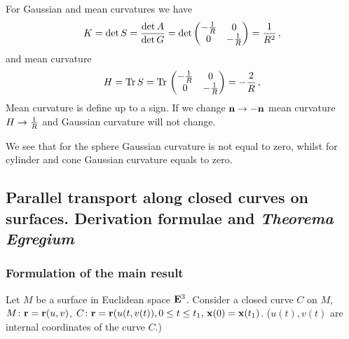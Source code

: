 \documentclass[12pt]{article}
\theoremstyle{theorem}
\numberwithin{equation}{section}
\begin{document}
For Gaussian and mean curvatures we have
     \begin{equation}\label{Gaussianforcylinder}
        K=\det S={\det A\over \det G}=\det
                              \begin{pmatrix}-{1\over R}&0\cr
                                0&-{1\over R}\cr
                                   \end{pmatrix}={1\over R^2}\,,
     \end{equation}
     and mean curvature
      \begin{equation}\label{meanianforcylinder}
        H={\rm Tr\,} S={\rm Tr\,}
                              \begin{pmatrix}-{1\over R}&0\cr
                                0&-{1\over R}\cr
                                   \end{pmatrix}=-{2\over R}\,,
     \end{equation}
Mean curvature is define up to a sign. If we change ${\bf n}\to-{\bf n}$ mean curvature $H\to {1\over R}$ and Gaussian curvature
will not change.


We see that for the sphere  Gaussian curvature is not equal to zero, whilst for cylinder and cone Gaussian curvature
equals to zero.


\subsection {Parallel transport along closed curves on surfaces. Derivation formulae and {\it Theorema Egregium} }

\subsubsection {Formulation of the main result}

Let $M$ be a surface in  Euclidean space ${\bf E}^3$.
  Consider a closed curve $C$ on $M$,
  $M\colon {\bf r}={\bf r}(u,v)$, $C\colon {\bf r}={\bf r}(u(t,v(t)), 0\leq t\leq t_1, \, {\bf x}(0)={\bf x}(t_1)$.
  ($u(t), v(t)$ are internal coordinates of the curve $C$.)
\end{document}
